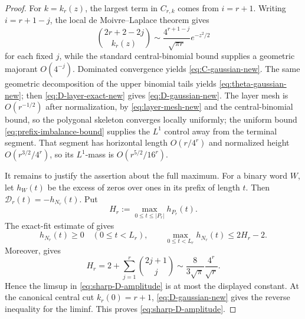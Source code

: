 \documentclass[11pt]{article}
\theoremstyle{definition}
\theoremstyle{remark}
\begin{document}
\begin{proof}
For $k=k_r(z)$, the largest term in $C_{r,k}$ comes from $i=r+1$.
Writing $i=r+1-j$, the local de Moivre--Laplace theorem
\cite{Petrov1975} gives
\[
\binom{2r+2-2j}{k_r(z)}
\sim
\frac{4^{r+1-j}}{\sqrt{\pi r}}e^{-z^2/2}
\]
for each fixed $j$, while the standard central-binomial bound supplies a
geometric majorant $O(4^{-j})$.  Dominated convergence yields
\eqref{eq:C-gaussian-new}.  The same geometric decomposition of the upper
binomial tails yields \eqref{eq:theta-gaussian-new}; then
\eqref{eq:D-layer-exact-new} gives \eqref{eq:D-gaussian-new}.  The layer mesh
is $O(r^{-1/2})$ after normalization, by \eqref{eq:layer-mesh-new} and the
central-binomial bound, so the polygonal skeleton converges locally uniformly;
the uniform bound \eqref{eq:prefix-imbalance-bound} supplies the \(L^1\)
control away from the terminal segment.  That segment has horizontal length
\(O(r/4^r)\) and normalized height \(O(r^{3/2}/4^r)\), so its \(L^1\)-mass is
\(O(r^{5/2}/16^r)\).

It remains to justify the assertion about the full maximum.  For a binary
word \(W\), let \(h_W(t)\) be the excess of zeros over ones in its prefix
of length \(t\).  Then \(\mathscr D_r(t)=-h_{N_r}(t)\).  Put
\[
 H_r:=\max_{0\le t\le|P_r|}h_{P_r}(t).
\]
The exact-fit estimate of \cite[Lemmas~2.9--2.10]{Cloitre2026} gives
\[
 h_{N_r}(t)\ge0\quad(0\le t<L_r),
 \qquad
 \max_{0\le t<L_r}h_{N_r}(t)\le2H_r-2.
\]
Moreover, \cite[Theorem~1.1(ii)]{Cloitre2026} gives
\[
 H_r=2+\sum_{j=1}^{r}\binom{2j+1}{j}
 \sim\frac{8}{3\sqrt\pi}\frac{4^r}{\sqrt r}.
\]
Hence the limsup in \eqref{eq:sharp-D-amplitude} is at most the displayed
constant.  At the canonical central cut \(k_r(0)=r+1\),
\eqref{eq:D-gaussian-new} gives the reverse inequality for the liminf.
This proves \eqref{eq:sharp-D-amplitude}.
\end{proof}
\end{document}
